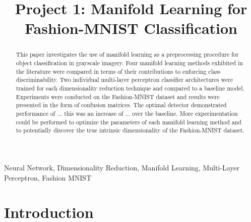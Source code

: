 \documentclass[conference]{IEEEtran}
\begin{document}
\title{Project 1: Manifold Learning for Fashion-MNIST Classification}
\author{

}

\maketitle


\begin{abstract}
	This paper investigates the use of manifold learning as a preprocessing procedure for object classification in grayscale imagery.  Four manifold learning methods exhibited in the literature were compared in terms of their contributions to enforcing class discriminability.  Two individual multi-layer perceptron classifier architectures were trained for each dimensionality reduction technique and compared to a baseline model. Experiments were conducted on the Fashion-MNIST dataset and results were presented in the form of confusion matrices.  The optimal detector demonstrated performance of ... this was an increase of ... over the baseline.  More experimentation could be performed to optimize the parameters of each manifold learning method and to potentially discover the true intrinsic dimensionality of the Fashion-MNIST dataset.
\end{abstract} 

\begin{IEEEkeywords}
Neural Network, Dimensionality Reduction, Manifold Learning, Multi-Layer Perceptron, Fashion MNIST
\end{IEEEkeywords}


\section{Introduction} 
\end{document}
